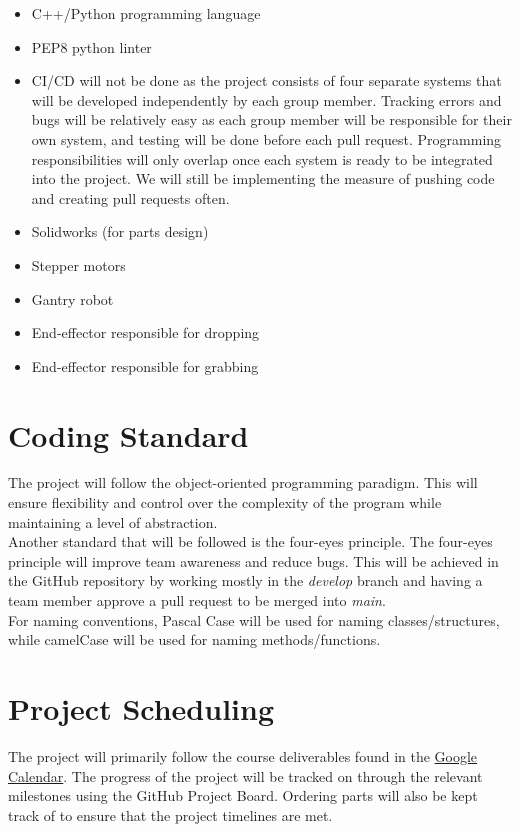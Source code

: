 \documentclass{article}
\begin{document}
	\begin{itemize}
	\item C++/Python programming language
	\item PEP8 python linter
	\item CI/CD will not be done as the project consists of four separate systems that will be developed independently by each group member. Tracking errors and bugs will be relatively 
	easy as each group member will be responsible for their own system, and testing will be done before each pull request. Programming responsibilities will only overlap once each 
	system is ready to be integrated into the project. We will still be implementing the measure of pushing code and creating pull requests often.
	\item Solidworks (for parts design)
	\item Stepper motors
	\item Gantry robot
	\item End-effector responsible for dropping
	\item End-effector responsible for grabbing
	\end{itemize}
	
	\section{Coding Standard}
	The project will follow the object-oriented programming paradigm. This will ensure flexibility 
	and control over the complexity of the program while maintaining a level of abstraction.\\

	\noindent Another standard that will be followed is the four-eyes principle. The four-eyes principle 
	will improve team awareness and reduce bugs. This will be achieved in the GitHub repository by 
	working mostly in the \emph{develop} branch and having a team member approve a pull request to be merged into \emph{main}.\\

	\noindent For naming conventions, Pascal Case will be used for naming classes/structures, while camelCase will be used for naming methods/functions.

	\section{Project Scheduling}
	The project will primarily follow the course deliverables found in the 
	\href{https://calendar.google.com/calendar/embed?src=rnboqiaki1k2la7rpu3bn0um58%40group.calendar.google.com&ctz=America%2FToronto}{Google Calendar}. 
	The progress of the project will be tracked on through the relevant milestones using the GitHub Project Board. 
	Ordering parts will also be kept track of to ensure that the project timelines are met.\\
\end{document}
